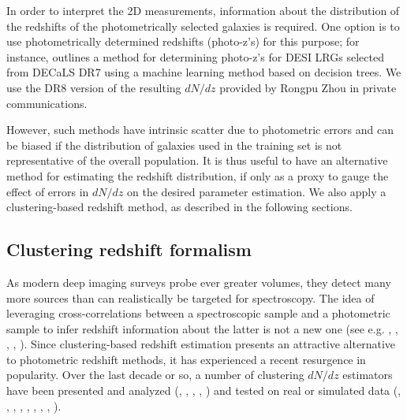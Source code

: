 \documentclass[a4paper,usenatbib]{mnras}
\begin{document}
In order to interpret the 2D measurements, information about the distribution of the redshifts of the photometrically selected galaxies is required. One option is to use photometrically determined redshifts (photo-z's) for this purpose; for instance, \citealt{Zhou++20} outlines a method for determining photo-z's for DESI LRGs selected from DECaLS DR7 using a machine learning method based on decision trees. We use the DR8 version of the resulting $dN/dz$ provided by Rongpu Zhou in private communications. 

However, such methods have intrinsic scatter due to photometric errors and can be biased if the distribution of galaxies used in the training set is not representative of the overall population. It is thus useful to have an alternative method for estimating the redshift distribution, if only as a proxy to gauge the effect of errors in $dN/dz$ on the desired parameter estimation. We also apply a clustering-based redshift method, as described in the following sections.

\subsection{Clustering redshift formalism}

As modern deep imaging surveys probe ever greater volumes, they detect many more sources than can realistically be targeted for spectroscopy. The idea of leveraging cross-correlations between a spectroscopic sample and a photometric sample to infer redshift information about the latter is not a new one (see e.g. \citealt{SeldnerPeebles79}, \citealt{PhillippsShanks87}, \citealt{Landy++96}, \citealt{Ho08}, \citealt{Newman08}). Since clustering-based redshift estimation presents an attractive alternative to photometric redshift methods, it has experienced a recent resurgence in popularity. Over the last decade or so, a number of clustering $dN/dz$ estimators have been presented and analyzed (\citealt{MatthewsNewman10}, \citealt{Schulz10}, \citealt{MatthewsNewman12}, \citealt{McQuinnWhite13}, \citealt{Menard13}) and tested on real or simulated data (\citealt{Schmidt13}, \citealt{Scottez++16}, \citealt{Hildebrandt++17}, \citealt{Scottez++18}, \citealt{Davis++18}, \citealt{Gatti18}, \citealt{Chiang18}, \citealt{Krolewski19}, \citealt{Kitanidis++19}). 
\end{document}
